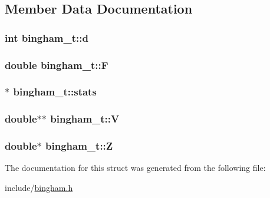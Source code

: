 \subsection{Member Data Documentation}
\hypertarget{structbingham__t_ab6512093b725c54391b002850d79af5e}{
\subsubsection[{d}]{\setlength{\rightskip}{0pt plus 5cm}int {\bf bingham\_\-t::d}}}
\label{structbingham__t_ab6512093b725c54391b002850d79af5e}
\hypertarget{structbingham__t_a61db9d1ae00e33e4d79d62c10a1d5ec6}{
\subsubsection[{F}]{\setlength{\rightskip}{0pt plus 5cm}double {\bf bingham\_\-t::F}}}
\label{structbingham__t_a61db9d1ae00e33e4d79d62c10a1d5ec6}
\hypertarget{structbingham__t_a4da270f685dce0e8f2aab03273547f99}{
\subsubsection[{stats}]{$\ast$ {\bf bingham\_\-t::stats}}}
\label{structbingham__t_a4da270f685dce0e8f2aab03273547f99}
\hypertarget{structbingham__t_aefd8cb6f68e12a9ea8ef39793484d78a}{
\subsubsection[{V}]{\setlength{\rightskip}{0pt plus 5cm}double$\ast$$\ast$ {\bf bingham\_\-t::V}}}
\label{structbingham__t_aefd8cb6f68e12a9ea8ef39793484d78a}
\hypertarget{structbingham__t_a928a824fae21520964eb3fe48e7f4562}{
\subsubsection[{Z}]{\setlength{\rightskip}{0pt plus 5cm}double$\ast$ {\bf bingham\_\-t::Z}}}
\label{structbingham__t_a928a824fae21520964eb3fe48e7f4562}


The documentation for this struct was generated from the following file:\begin{DoxyCompactItemize}
\item 
include/\hyperlink{bingham_8h}{bingham.h}\end{DoxyCompactItemize}

